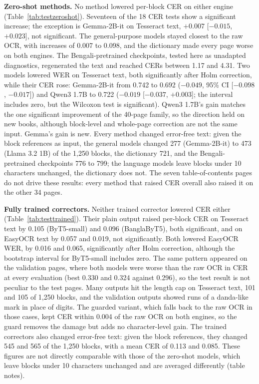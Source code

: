 \documentclass[conference]{IEEEtran}
\begin{document}
\textbf{Zero-shot methods.} No method lowered per-block CER on either engine (Table~\ref{tab:testzeroshot}). Seventeen of the 18 CER tests show a significant increase; the exception is Gemma-2B-it on Tesseract text, $+0.007$ [$-0.015$, $+0.023$], not significant. The general-purpose models stayed closest to the raw OCR, with increases of 0.007 to 0.098, and the dictionary made every page worse on both engines. The Bengali-pretrained checkpoints, tested here as unadapted diagnostics, regenerated the text and reached CERs between 1.17 and 4.31. Two models lowered WER on Tesseract text, both significantly after Holm correction, while their CER rose: Gemma-2B-it from 0.742 to 0.692 ($-0.049$, 95\% CI [$-0.098$, $-0.017$]) and Qwen3 1.7B to 0.722 ($-0.019$ [$-0.037$, $+0.003$]; the interval includes zero, but the Wilcoxon test is significant). Qwen3 1.7B's gain matches the one significant improvement of the 40-page family, so the direction held on new books, although block-level and whole-page correction are not the same input. Gemma's gain is new. Every method changed error-free text: given the block references as input, the general models changed 277 (Gemma-2B-it) to 473 (Llama 3.2 1B) of the 1{,}250 blocks, the dictionary 721, and the Bengali-pretrained checkpoints 776 to 799; the language models leave blocks under 10 characters unchanged, the dictionary does not. The seven table-of-contents pages do not drive these results: every method that raised CER overall also raised it on the other 34 pages.



\textbf{Fully trained correctors.} Neither trained corrector lowered CER either (Table~\ref{tab:testtrained}). Their plain output raised per-block CER on Tesseract text by 0.105 (ByT5-small) and 0.096 (BanglaByT5), both significant, and on EasyOCR text by 0.057 and 0.019, not significantly. Both lowered EasyOCR WER, by 0.016 and 0.065, significantly after Holm correction, although the bootstrap interval for ByT5-small includes zero. The same pattern appeared on the validation pages, where both models were worse than the raw OCR in CER at every evaluation (best 0.330 and 0.324 against 0.296), so the test result is not peculiar to the test pages. Many outputs hit the length cap on Tesseract text, 101 and 105 of 1{,}250 blocks, and the validation outputs showed runs of a danda-like mark in place of digits. The guarded variant, which falls back to the raw OCR in those cases, kept CER within 0.004 of the raw OCR on both engines, so the guard removes the damage but adds no character-level gain. The trained correctors also changed error-free text: given the block references, they changed 545 and 565 of the 1{,}250 blocks, with a mean CER of 0.113 and 0.085. These figures are not directly comparable with those of the zero-shot models, which leave blocks under 10 characters unchanged and are averaged differently (table notes).
\end{document}
